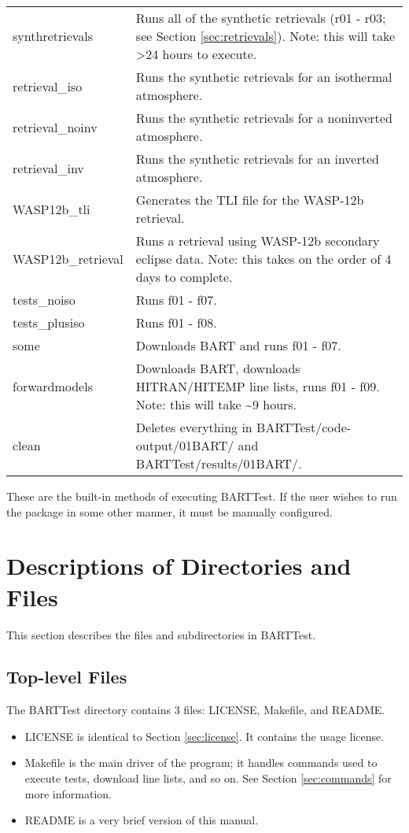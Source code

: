 \documentclass[letterpaper, 12pt]{article}
\begin{document}
\begin{table}[ht]
\begin{tabular}{ll}
synthretrievals & Runs all of the synthetic retrievals (r01 - r03; see Section \ref{sec:retrievals}). Note: this will take {\textgreater}24 hours to execute.\\
retrieval{\_}iso & Runs the synthetic retrievals for an isothermal atmosphere.\\
retrieval{\_}noinv & Runs the synthetic retrievals for a noninverted atmosphere.\\
retrieval{\_}inv & Runs the synthetic retrievals for an inverted atmosphere.\\
WASP12b{\_}tli & Generates the TLI file for the WASP-12b retrieval.\\
WASP12b{\_}retrieval & Runs a retrieval using WASP-12b secondary eclipse data. Note: this takes on the order of 4 days to complete.\\
tests{\_}noiso & Runs f01 - f07.\\
tests{\_}plusiso & Runs f01 - f08.\\
some & Downloads BART and runs f01 - f07.\\
forwardmodels & Downloads BART, downloads HITRAN/HITEMP line lists, runs f01 - f09. Note: this will take {\sim}9 hours.\\
clean & Deletes everything in BARTTest/code-output/01BART/ and BARTTest/results/01BART/.\\
\hline
\end{tabular}
\end{table}

These are the built-in methods of executing BARTTest. If the user wishes to 
run the package in some other manner, it must be manually configured.

\section{Descriptions of Directories and Files}
\label{sec:files}

This section describes the files and subdirectories in BARTTest.

\subsection{Top-level Files}
The BARTTest directory contains 3 files: LICENSE, Makefile, and README.

\begin{itemize} \itemsep0pt
  \item LICENSE is identical to Section \ref{sec:license}. It contains the 
        usage license.
  \item Makefile is the main driver of the program; it handles commands used 
        to execute tests, download line lists, and so on. See Section 
        \ref{sec:commands} for more information.
  \item README is a very brief version of this manual.
\end{itemize}
\end{document}
